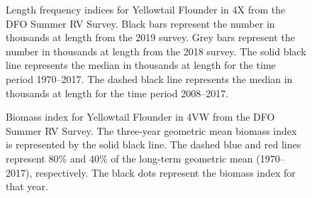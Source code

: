 \documentclass[11pt]{book}
\begin{document}
\begin{figure}[htb]

{\centering {} 

}

\caption{Length frequency indices for Yellowtail Flounder in 4X from the DFO Summer RV Survey. Black bars represent the number in thousands at length from the 2019 survey. Grey bars represent the number in thousands at length from the 2018 survey. The solid black line represents the median in thousands at length for the time period 1970--2017. The dashed black line represents the median in thousands at length for the time period 2008--2017.}\label{fig:47-fig-ytflounder-lengthfreq4X}
\end{figure}

\begin{figure}[htb]

{\centering {} 

}

\caption{Biomass index for Yellowtail Flounder in 4VW from the DFO Summer RV Survey. The three-year geometric mean biomass index is represented by the solid black line. The dashed blue and red lines represent 80\% and 40\% of the long-term geometric mean (1970--2017), respectively. The black dots represent the biomass index for that year.}\label{fig:48-fig-ytflounder-biomass4VW}
\end{figure}
\end{document}
